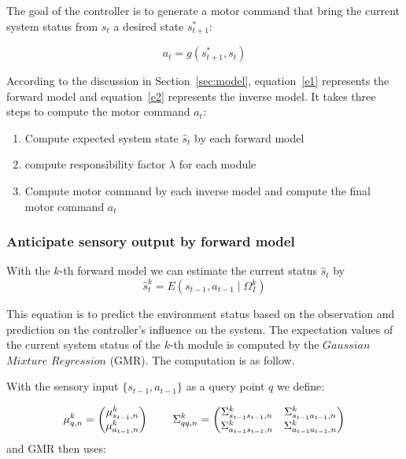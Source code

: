 The goal of the controller is to generate a motor command that bring the current system status from $s_t$ a desired state $s^*_{t+1}$:

\begin{equation}
\label{e2}
a_t = g\left({s^*_{t+1},s_t}\right)
\end{equation}

According to the discussion in Section~\ref{sec:model}, equation~\ref{e1} represents the forward model and equation~\ref{e2} represents the inverse model. It takes three steps to compute the motor command $a_t$:
\begin{enumerate}
\item Compute expected system state $\hat{s}_t$ by each forward model
\item compute responsibility factor $\lambda$ for each module
\item Compute motor command by each inverse model and compute the final motor command $a_t$
\end{enumerate}


\subsubsection{Anticipate sensory output by forward model}
\label{sec:forward}
With the $k$-th forward model we can estimate the current status $\hat{s}_t$ by
\begin{equation}
\label{e3}
\hat{s}^k_{t} = E\left({s_{t-1}, a_{t-1} \mid \Omega^k_I}\right)
\end{equation}

%

This equation is to predict the environment status based on the observation and prediction on the controller's influence on the system. The expectation values of the current system status of the $k$-th module is computed by the $Gaussian$ $Mixture$ $Regression$ (GMR). The computation is as follow.

With the sensory input $\{s_{t-1},a_{t-1}\}$ as a query point $q$ we define:

\begin{equation}
{
 {\mu}_{q,n}^k = \begin{pmatrix} {\mu}_{s_{t-1},n}^k    \\
                                        {\mu}_{a_{t-1},n}^k
                        \end{pmatrix}
\hspace{0.3in}
{\Sigma}_{qq,n}^k =  \begin{pmatrix} {\Sigma}_{s_{t-1}s_{t-1},n}^k  & {\Sigma}_{s_{t-1}{a_{t-1},n}}^k  \\
                                            {\Sigma}_{{a_{t-1}}{s_{t-1}},n}^k  & {\Sigma}_{{a_{t-1}}{a_{t-1}},n}^k
                            \end{pmatrix}
}
\end{equation}
and GMR then uses:

